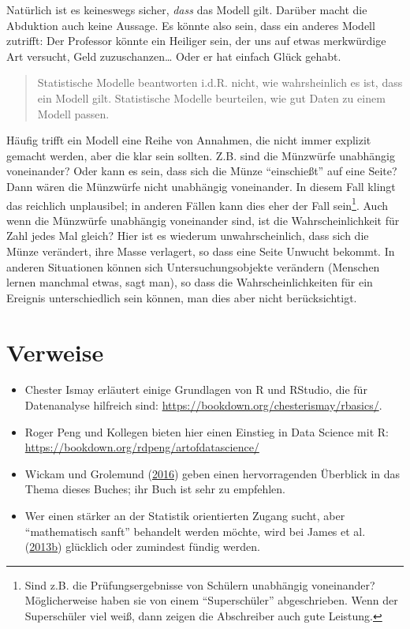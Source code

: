 \documentclass[12pt,]{book}
\begin{document}
Natürlich ist es keineswegs sicher, \emph{dass} das Modell gilt. Darüber
macht die Abduktion auch keine Aussage. Es könnte also sein, dass ein
anderes Modell zutrifft: Der Professor könnte ein Heiliger sein, der uns
auf etwas merkwürdige Art versucht, Geld zuzuschanzen\ldots{} Oder er
hat einfach Glück gehabt.

\begin{quote}
Statistische Modelle beantworten i.d.R. nicht, wie wahrsheinlich es ist,
dass ein Modell gilt. Statistische Modelle beurteilen, wie gut Daten zu
einem Modell passen.
\end{quote}

Häufig trifft ein Modell eine Reihe von Annahmen, die nicht immer
explizit gemacht werden, aber die klar sein sollten. Z.B. sind die
Münzwürfe unabhängig voneinander? Oder kann es sein, dass sich die Münze
``einschießt'' auf eine Seite? Dann wären die Münzwürfe nicht unabhängig
voneinander. In diesem Fall klingt das reichlich unplausibel; in anderen
Fällen kann dies eher der Fall sein\footnote{Sind z.B. die
  Prüfungsergebnisse von Schülern unabhängig voneinander? Möglicherweise
  haben sie von einem ``Superschüler'' abgeschrieben. Wenn der
  Superschüler viel weiß, dann zeigen die Abschreiber auch gute
  Leistung.}. Auch wenn die Münzwürfe unabhängig voneinander sind, ist
die Wahrscheinlichkeit für Zahl jedes Mal gleich? Hier ist es wiederum
unwahrscheinlich, dass sich die Münze verändert, ihre Masse verlagert,
so dass eine Seite Unwucht bekommt. In anderen Situationen können sich
Untersuchungsobjekte verändern (Menschen lernen manchmal etwas, sagt
man), so dass die Wahrscheinlichkeiten für ein Ereignis unterschiedlich
sein können, man dies aber nicht berücksichtigt.

\section{Verweise}\label{verweise}

\begin{itemize}
\item
  Chester Ismay erläutert einige Grundlagen von R und RStudio, die für
  Datenanalyse hilfreich sind:
  \url{https://bookdown.org/chesterismay/rbasics/}.
\item
  Roger Peng und Kollegen bieten hier einen Einstieg in Data Science mit
  R: \url{https://bookdown.org/rdpeng/artofdatascience/}
\item
  Wickam und Grolemund (\protect\hyperlink{ref-r4ds}{2016}) geben einen
  hervorragenden Überblick in das Thema dieses Buches; ihr Buch ist sehr
  zu empfehlen.
\item
  Wer einen stärker an der Statistik orientierten Zugang sucht, aber
  ``mathematisch sanft'' behandelt werden möchte, wird bei James et al.
  (\protect\hyperlink{ref-introstatlearning}{2013}\protect\hyperlink{ref-introstatlearning}{b})
  glücklich oder zumindest fündig werden.
\end{itemize}
\end{document}
